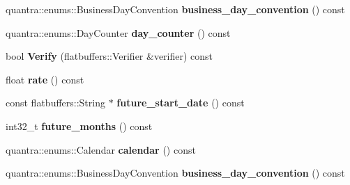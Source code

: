 \begin{DoxyCompactItemize}
\item 
\mbox{\label{structquantra_1_1FLATBUFFERS__FINAL__CLASS_acc1afb278b3cf7c9923940b4704456f9}} 
quantra\+::enums\+::\+Business\+Day\+Convention {\bfseries business\+\_\+day\+\_\+convention} () const
\item 
\mbox{\label{structquantra_1_1FLATBUFFERS__FINAL__CLASS_a955b9a33f908db3b82dea98242bc214e}} 
quantra\+::enums\+::\+Day\+Counter {\bfseries day\+\_\+counter} () const
\item 
\mbox{\label{structquantra_1_1FLATBUFFERS__FINAL__CLASS_aed693ee5a45b5f53af7411f9cab6793a}} 
bool {\bfseries Verify} (flatbuffers\+::\+Verifier \&verifier) const
\item 
\mbox{\label{structquantra_1_1FLATBUFFERS__FINAL__CLASS_aa5a25f3bfb8a4b4822cb5fcb1b479ff8}} 
float {\bfseries rate} () const
\item 
\mbox{\label{structquantra_1_1FLATBUFFERS__FINAL__CLASS_a9993b32c191d96962b2964028f86d2b1}} 
const flatbuffers\+::\+String $\ast$ {\bfseries future\+\_\+start\+\_\+date} () const
\item 
\mbox{\label{structquantra_1_1FLATBUFFERS__FINAL__CLASS_a8a47248aadc3df89fdd559fbe1bf414e}} 
int32\+\_\+t {\bfseries future\+\_\+months} () const
\item 
\mbox{\label{structquantra_1_1FLATBUFFERS__FINAL__CLASS_a22bef2961bc16a42406e7b6c3d62a33e}} 
quantra\+::enums\+::\+Calendar {\bfseries calendar} () const
\item 
\mbox{\label{structquantra_1_1FLATBUFFERS__FINAL__CLASS_acc1afb278b3cf7c9923940b4704456f9}} 
quantra\+::enums\+::\+Business\+Day\+Convention {\bfseries business\+\_\+day\+\_\+convention} () const
\item 
\mbox{\label{structquantra_1_1FLATBUFFERS__FINAL__CLASS_a955b9a33f908db3b82dea98242bc214e}} 

\end{DoxyCompactItemize}
